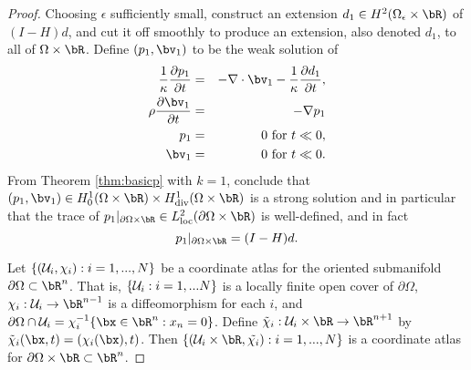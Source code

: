 \begin{proof}
  Choosing $\epsilon$ sufficiently small, construct an extension $d_1\in H^2(\Omega_{\epsilon}\times \bR)$ of $(I-H)d$, and cut it off smoothly to produce an extension, also denoted $d_1$, to all of $\Omega \times \bR$. Define $(p_1,\bv_1)$ to be the weak solution of
\begin{eqnarray}
\label{eqn:awepm1}
\frac{1}{\kappa}\frac{\partial p_1}{\partial t} & = & - \nabla \cdot \bv_1 -
\frac{1}{\kappa}\frac{\partial d_1}{\partial t}, \nonumber \\
\rho\frac{\partial \bv_1}{\partial t} & = & - \nabla p_1 \\
p_1& =& 0 \mbox{ for } t \ll 0,\nonumber\\ 
\bv_1 & = & 0 \mbox{ for } t \ll 0.
\end{eqnarray}
From Theorem \ref{thm:basicp} with $k=1$, conclude that $(p_1,\bv_1)
\in H^1_0(\Omega \times \bR) \times H^1_{\rm div}(\Omega \times \bR)$
is a strong solution and in particular that the trace of
$p_1|_{\partial \Omega \times \bR} \in L^2_{\rm loc}(\partial \Omega \times \bR)$ is
well-defined, and in fact
\begin{equation}
  \label{eqn:smparttrace}
  p_1|_{\partial \Omega \times \bR} = (I-H)d.
\end{equation}

Let $\{({\cal U}_i, \chi_i): i=1,...,N\}$ be a coordinate atlas for
the oriented submanifold $\partial \Omega \subset \bR^n$. That is,
$\{{\cal U}_i: i=1,...N\}$ is a locally finite open cover of $\partial \Omega$, 
$\chi_i:{\cal U}_i \rightarrow \bR^{n-1}$ is a diffeomorphism for each $i$, and
$\partial \Omega \cap {\cal U}_i = \chi_i^{-1}\{\bx \in \bR^n:
x_n=0\}$. Define $\tilde{\chi}_i: {\cal U}_i \times \bR \rightarrow
\bR^{n+1}$ by $\tilde{\chi}_i(\bx,t) = (\chi_i(\bx),t)$. Then $\{({\cal U}_i \times \bR, \tilde{\chi_i}):
i=1,...,N\}$ is a coordinate atlas for $\partial \Omega \times \bR \subset \bR^n$.


\end{proof}
